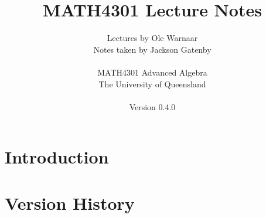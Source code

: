 \documentclass[a4paper]{report}
\title{MATH4301 Lecture Notes}
\author{Lectures by Ole Warnaar\\
Notes taken by Jackson Gatenby\\
\\
MATH4301 Advanced Algebra\\
The University of Queensland\\
\\
Version 0.4.0}
\begin{document}
\maketitle
\tableofcontents



\chapter{Introduction}







\appendix

\chapter{Version History}

\end{document}
